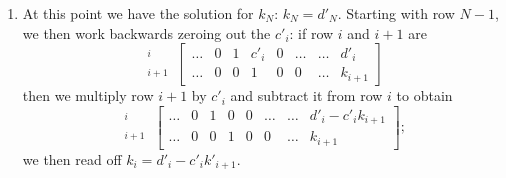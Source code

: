 \begin{enumerate}
\[\begin{array}{ccccccccccc}
	1 & c'_{0} \\
	 & 1 & c'_{1} \\
	&  & 1 & c'_{2}\\
	& &  & \ddots & \ddots \\
	& & &  & 1 & c'_{i} \\
	& & & &  & \ddots & \ddots \\
	& & & & &  & 1 & c'_{N-1} \\
	& & & & & &  & 1 
\end{array}\right]
\left[\begin{array}{c}
	k_{0}\\
	k_{1}\\
	k_{2}\\
	\vdots\\
	k_{i}\\
	\vdots\\
	k_{N-1}\\
	k_{N}
\end{array}\right] = 
\left[\begin{array}{c}
	d'_{0}\\
	d'_{1}\\
	d'_{2}\\
	\vdots\\
	d'_{i}\\
	\vdots\\
	d'_{N-1}\\
	d'_{N}
\end{array}\right].
\]

\item At this point we have the solution for $k_{N}$: $k_{N}=d'_{N}$. Starting with row $N-1$, we then work backwards zeroing out the $c'_{i}$: if row $i$ and $i+1$ are
\[
\begin{array}{r} {}^{i}\\ {}^{i+1}\end{array}\,
\left[\begin{array}{ccccccc|c}
	 \ldots & 0 & 1 & c'_{i} & 0 & \ldots & \ldots & d'_{i}\\
	 \ldots & 0 & 0 & 1      & 0 & 0      & \ldots & k_{i+1}
\end{array}\right]
\]
then we multiply row $i+1$ by $c'_{i}$ and subtract it from row $i$ to obtain
\[
\begin{array}{r} {}^{i}\\ {}^{i+1}\end{array}\,
\left[\begin{array}{ccccccc|c}
	 \ldots & 0 & 1 & 0 & 0 & \ldots & \ldots & d'_{i}-c'_{i}k_{i+1}\\
	 \ldots & 0 & 0 & 1 & 0 & 0      & \ldots & k_{i+1}
\end{array}\right];
\]
we then read off $k_{i} = d'_{i}-c'_{i}k'_{i+1}$.
\end{enumerate}
